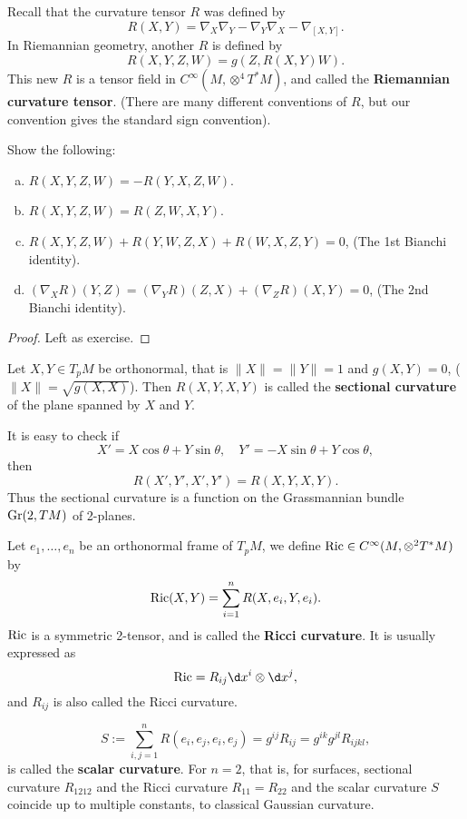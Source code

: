 \documentclass[12pt]{article}
\begin{document}
Recall that the curvature tensor \(R\) was defined by \[
    R(X,Y)=\nabla_X\nabla_Y-\nabla_Y\nabla_X-\nabla_{[X,Y]}
.\] In Riemannian geometry, another \(R\) is defined by \[
    R(X,Y,Z,W)=g(Z,R(X,Y)W)
.\] This new \(R\) is a tensor field in \(C^\infty(M,\otimes^4 T^*M)\), and called
the \textbf{Riemannian curvature tensor}. (There are many different conventions of
\(R\), but our convention gives the standard sign convention).
\begin{prop}
    Show the following:
    \begin{enumerate}[(a)]
    \item \(R(X,Y,Z,W)=-R(Y,X,Z,W)\).
    \item \(R(X,Y,Z,W)=R(Z,W,X,Y)\).
    \item \(R(X,Y,Z,W)+R(Y,W,Z,X)+R(W,X,Z,Y)=0\), (The 1st Bianchi identity).
    \item \((\nabla_X R)(Y,Z)=(\nabla_Y R)(Z,X)+(\nabla_Z R)(X,Y)=0\),
        (The 2nd Bianchi identity).
    \end{enumerate}
\end{prop}
\begin{proof}
    Left as exercise.
\end{proof}

\begin{definition}
    Let \(X,Y\in T_p M\) be orthonormal, that is \(\|X\|=\|Y\|=1\) and \(g(X,Y)=0\),
    (\(\|X\|=\sqrt{g(X,X)}\)). Then \(R(X,Y,X,Y)\) is called the \textbf{sectional
    curvature} of the plane spanned by \(X\) and \(Y\).
\end{definition}
It is easy to check if  \[
    X'=X\cos\theta+Y\sin\theta,\quad Y'=-X\sin\theta+Y\cos\theta
,\] then \[
    R(X',Y',X',Y')=R(X,Y,X,Y)
.\] Thus the sectional curvature is a function on the Grassmannian bundle
\(\operatorname{Gr}(2,TM)\) of 2-planes.

\begin{definition}
    Let \(e_1,\ldots,e_n\) be an orthonormal frame of \(T_p M\), we define
    \(\operatorname{Ric}\in C^\infty(M,\otimes^2 T^*M)\) by \[
        \operatorname{Ric}(X,Y)=\sum_{i=1}^{n}R(X,e_i,Y,e_i)
    .\] \(\operatorname{Ric}\) is a symmetric 2-tensor, and is called the \textbf{Ricci curvature}.
    It is usually expressed as \[
        \Ric=R_{ij}\dd{x^i}\otimes \dd{x^j}
    ,\] and \(R_{ij}\) is also called the Ricci curvature.

    \[
        S:=\sum_{i,j=1}^{n}R(e_i,e_j,e_i,e_j)=g^{ij}R_{ij}=g^{ik}g^{jl}R_{ijkl}
    ,\] is called the \textbf{scalar curvature}. For \(n=2\), that is, for surfaces,
    sectional curvature \(R_{1212}\) and the Ricci curvature \(R_{11}=R_{22}\) and
    the scalar curvature \(S\) coincide up to multiple constants, to classical
    Gaussian curvature.
\end{definition}
\end{document}
